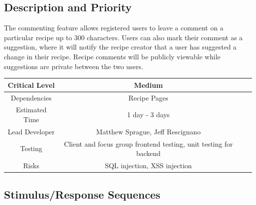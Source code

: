 \documentclass{scrreprt}
\begin{document}
\subsection{Description and Priority}

The commenting feature allows registered users to leave a comment on a particular recipe up to 300 characters. Users can also mark their comment as a suggestion, where it will notify the recipe creator that a user has suggested a change in their recipe. Recipe comments will be publicly viewable while suggestions are private between the two users.

\begin{center}
    \begin{tabular}{| c | c | c | c |}
        \hline
        Critical Level & Medium                                                            \\
        \hline
        Dependencies   & Recipe Pages                                                      \\
        \hline
        Estimated Time & 1 day - 3 days                                                    \\
        \hline
        Lead Developer & Matthew Sprague, Jeff Rescignano                           \\
        \hline
        Testing         & Client and focus group \gls{frontend} testing,
                          \gls{unit testing} for \gls{backend}                             \\
        \hline
        Risks          & \gls{SQL injection}, \gls{XSS injection}                          \\
        \hline
    \end{tabular}
\end{center}

\subsection{Stimulus/Response Sequences}
\end{document}
